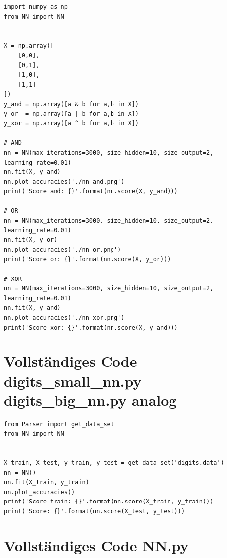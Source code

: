 \begin{lstlisting}[style=py]
import numpy as np
from NN import NN


X = np.array([
    [0,0],
    [0,1],
    [1,0],
    [1,1]
])
y_and = np.array([a & b for a,b in X])
y_or  = np.array([a | b for a,b in X])
y_xor = np.array([a ^ b for a,b in X])

# AND
nn = NN(max_iterations=3000, size_hidden=10, size_output=2, learning_rate=0.01)
nn.fit(X, y_and)
nn.plot_accuracies('./nn_and.png')
print('Score and: {}'.format(nn.score(X, y_and)))

# OR
nn = NN(max_iterations=3000, size_hidden=10, size_output=2, learning_rate=0.01)
nn.fit(X, y_or)
nn.plot_accuracies('./nn_or.png')
print('Score or: {}'.format(nn.score(X, y_or)))

# XOR
nn = NN(max_iterations=3000, size_hidden=10, size_output=2, learning_rate=0.01)
nn.fit(X, y_and)
nn.plot_accuracies('./nn_xor.png')
print('Score xor: {}'.format(nn.score(X, y_and)))

\end{lstlisting}

\section*{Vollständiges Code digits\_small\_nn.py digits\_big\_nn.py analog}

\begin{lstlisting}[style=py]
from Parser import get_data_set
from NN import NN


X_train, X_test, y_train, y_test = get_data_set('digits.data')
nn = NN()
nn.fit(X_train, y_train)
nn.plot_accuracies()
print('Score train: {}'.format(nn.score(X_train, y_train)))
print('Score: {}'.format(nn.score(X_test, y_test)))

\end{lstlisting}

\section*{Vollständiges Code NN.py}

